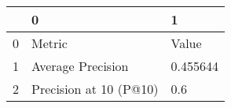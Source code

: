\begin{tabular}{lll}
\toprule
{} &                       0 &         1 \\
\midrule
0 &                  Metric &     Value \\
1 &       Average Precision &  0.455644 \\
2 &  Precision at 10 (P@10) &       0.6 \\
\bottomrule
\end{tabular}

